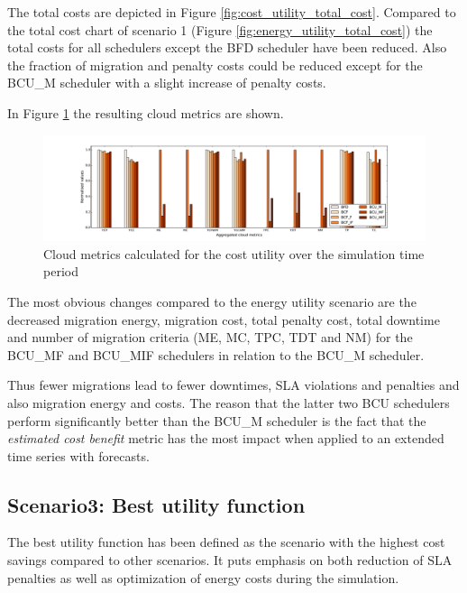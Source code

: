 The total costs are depicted in Figure \ref{fig:cost_utility_total_cost}. Compared to the total cost chart of scenario 1 (Figure \ref{fig:energy_utility_total_cost}) the total costs for all schedulers except the BFD scheduler have been reduced. Also the fraction of migration and penalty costs could be reduced except for the BCU\_M scheduler with a slight increase of penalty costs. 

In Figure \ref{fig:cost_utility_cloud_metrics} the resulting cloud metrics are shown. 

\begin{figure}[htbp]
	\centering
	\hspace*{-1.2in}
		\includegraphics[width=1.50\textwidth]{figures/evaluation_and_results/cost_utility_cloud_metrics.pdf}
	\caption{Cloud metrics calculated for the cost utility over the simulation time period}
	\label{fig:cost_utility_cloud_metrics}
\end{figure}

The most obvious changes compared to the energy utility scenario are the decreased migration energy, migration cost, total penalty cost, total downtime and number of migration criteria (ME, MC, TPC, TDT and NM) for the BCU\_MF and BCU\_MIF schedulers in relation to the BCU\_M scheduler. 

Thus fewer migrations lead to fewer downtimes, SLA violations and penalties and also migration energy and costs. The reason that the latter two BCU schedulers perform significantly better than the BCU\_M scheduler is the fact that the \textit{estimated cost benefit} metric has the most impact when applied to an extended time series with forecasts. 



\subsection{Scenario3: Best utility function}

The best utility function has been defined as the scenario with the highest cost savings compared to other scenarios. It puts emphasis on both reduction of SLA penalties as well as optimization of energy costs during the simulation. 


